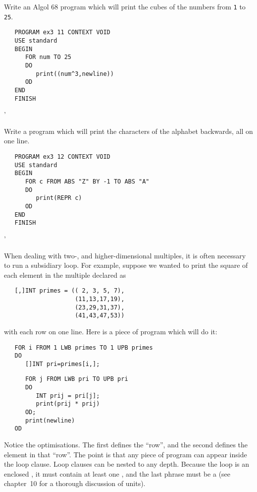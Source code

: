 \begin{exercise}
\item Write an Algol 68 program which will print the cubes of the numbers
from \verb|1| to \verb|25|. \ans \ %
\begin{verbatim}
   PROGRAM ex3 11 CONTEXT VOID
   USE standard
   BEGIN
      FOR num TO 25
      DO
         print((num^3,newline))
      OD
   END
   FINISH
\end{verbatim}
'
\item Write a program which will print the characters of the alphabet
backwards, all on one line. \ans \ %
\begin{verbatim}
   PROGRAM ex3 12 CONTEXT VOID
   USE standard
   BEGIN
      FOR c FROM ABS "Z" BY -1 TO ABS "A"
      DO
         print(REPR c)
      OD
   END
   FINISH
\end{verbatim}
'
\end{exercise}

When dealing with two-, and higher-dimensional multiples, it is often
necessary to run a subsidiary loop. For example, suppose we wanted to
print the square of each element in the multiple declared as
\begin{verbatim}
   [,]INT primes = (( 2, 3, 5, 7),
                    (11,13,17,19),
                    (23,29,31,37),
                    (41,43,47,53))
\end{verbatim}
\noindent
with each row on one line. Here is a piece of program which will do
it:
\begin{verbatim}
   FOR i FROM 1 LWB primes TO 1 UPB primes
   DO
      []INT pri=primes[i,];
\end{verbatim}
\begin{verbatim}
      FOR j FROM LWB pri TO UPB pri
      DO
         INT prij = pri[j];
         print(prij * prij)
      OD;
      print(newline)
   OD
\end{verbatim}
\noindent
Notice the optimisations. The first defines the 
``row'', and the second defines the  element in that
``row''. The point is that any piece of program can appear inside the
loop clause.  Loop clauses can be nested to any depth.  Because the
loop  is an enclosed
, it must contain at least one
, and the last phrase must be a  (see chapter~10
for a thorough discussion of units).

